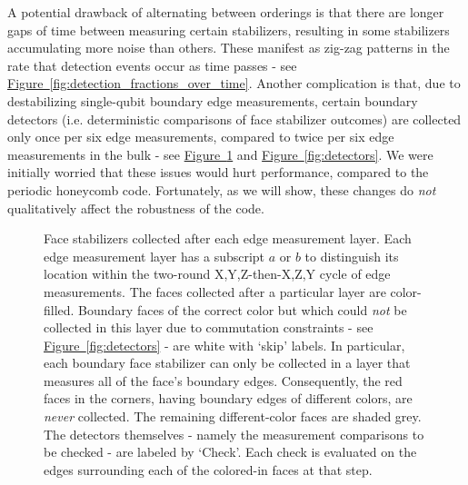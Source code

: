 \documentclass[onecolumn,a4paper,accepted=2022-09-12]{quantumarticle}
\theoremstyle{definition}
\theoremstyle{definition}
\theoremstyle{definition}
\newcommand{\fig}[1]{\hyperref[fig:#1]{Figure~\ref*{fig:#1}}}
\begin{document}
A potential drawback of alternating between orderings is that there are longer gaps of time between measuring certain stabilizers, resulting in some stabilizers accumulating more noise than others.
These manifest as zig-zag patterns in the rate that detection events occur as time passes - see \fig{detection_fractions_over_time}.
Another complication is that, due to destabilizing single-qubit boundary edge measurements, certain boundary detectors (i.e. deterministic comparisons of face stabilizer outcomes) are collected only once per six edge measurements, compared to twice per six edge measurements in the bulk - see \fig{parity_check_cycle} and \fig{detectors}.
We were initially worried that these issues would hurt performance, compared to the periodic honeycomb code.
Fortunately, as we will show, these changes do \emph{not} qualitatively affect the robustness of the code.

\begin{figure}[ht!]
    \centering
    \caption{
    Face stabilizers collected after each edge measurement layer.  
    Each edge measurement layer has a subscript $a$ or $b$ to distinguish its location within the two-round X,Y,Z-then-X,Z,Y cycle of edge measurements. 
    The faces collected after a particular layer are color-filled.  
    Boundary faces of the correct color but which could \emph{not} be collected in this layer due to commutation constraints - see \fig{detectors} - are white with `skip' labels.  
    In particular, each boundary face stabilizer can only be collected in a layer that measures all of the face's boundary edges.
    Consequently, the red faces in the corners, having boundary edges of different colors, are \emph{never} collected.  
    The remaining different-color faces are shaded grey.  
    The detectors themselves - namely the measurement comparisons to be checked - are labeled by `Check'.
    Each check is evaluated on the edges surrounding each of the colored-in faces at that step.
    }
    \label{fig:parity_check_cycle}
\end{figure}
\end{document}
